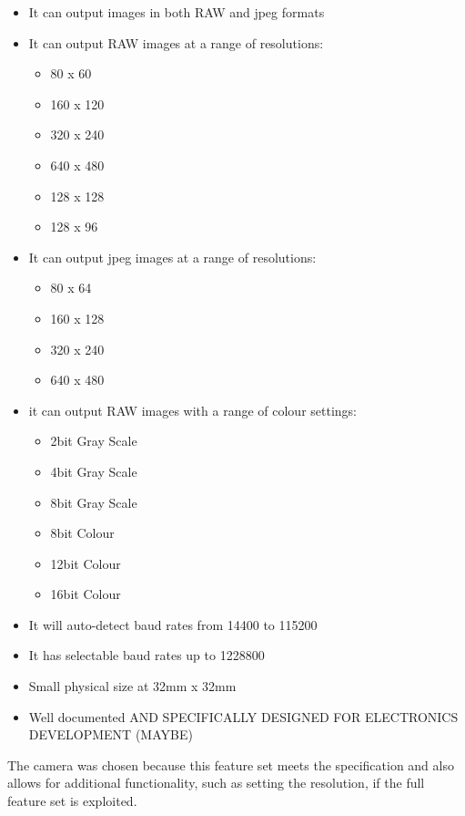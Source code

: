 	\begin{itemize}
		\item It can output images in both RAW and jpeg formats
		\item It can output RAW images at a range of resolutions:
		\begin{itemize}
			\item 80 x 60
			\item 160 x 120
			\item 320 x 240
			\item 640 x 480
			\item 128 x 128
			\item 128 x 96
		\end{itemize}
		\item It can output jpeg images at a range of resolutions:
		\begin{itemize}
			\item 80 x 64
			\item 160 x 128
			\item 320 x 240
			\item 640 x 480
		\end{itemize}
		\item it can output RAW images with a range of colour settings:
		\begin{itemize}
			\item 2bit Gray Scale
			\item 4bit Gray Scale
			\item 8bit Gray Scale
			\item 8bit Colour
			\item 12bit Colour
			\item 16bit Colour
		\end{itemize}
		\item It will auto-detect baud rates from 14400 to 115200
		\item It has selectable baud rates up to 1228800
		\item Small physical size at 32mm x 32mm
		\item Well documented AND SPECIFICALLY DESIGNED FOR ELECTRONICS DEVELOPMENT (MAYBE)
	\end{itemize}

The camera was chosen because this feature set meets the specification and also allows for additional functionality, such as setting the resolution, if the full feature set is exploited.